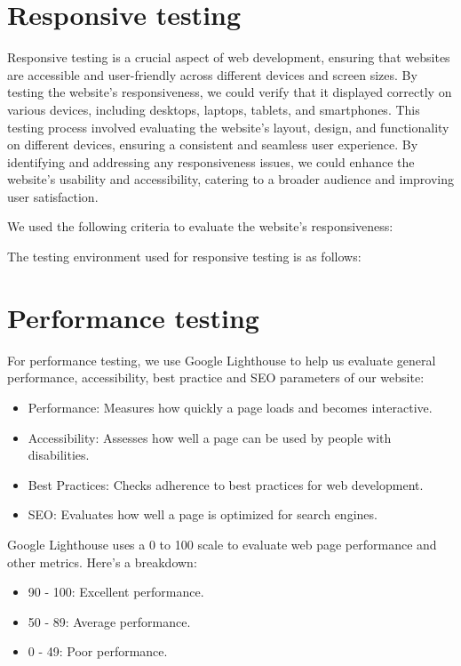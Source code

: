 



\section{Responsive testing}
Responsive testing is a crucial aspect of web development, ensuring that
websites are accessible and user-friendly across different devices and
screen sizes. By testing the website's responsiveness, we could verify
that it displayed correctly on various devices, including desktops,
laptops, tablets, and smartphones. This testing process involved
evaluating the website's layout, design, and functionality on different
devices, ensuring a consistent and seamless user experience. By
identifying and addressing any responsiveness issues, we could enhance
the website's usability and accessibility, catering to a broader audience
and improving user satisfaction.

We used the following criteria to evaluate the website's responsiveness:


The testing environment used for responsive testing is as follows:


\section{Performance testing}
For performance testing, we use Google Lighthouse to help us evaluate general performance, accessibility, best practice and SEO parameters of our website:
\begin{itemize}
  \item Performance: Measures how quickly a page loads and becomes interactive.
  \item Accessibility: Assesses how well a page can be used by people with disabilities.
  \item Best Practices: Checks adherence to best practices for web development.
  \item SEO: Evaluates how well a page is optimized for search engines.
\end{itemize}
Google Lighthouse uses a 0 to 100 scale to evaluate web page performance and other metrics. Here’s a breakdown:
\begin{itemize}
  \item 90 - 100: Excellent performance.
  \item 50 - 89: Average performance.
  \item 0 - 49: Poor performance.
\end{itemize}

